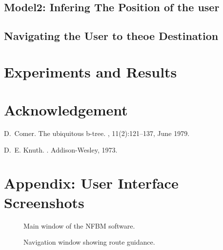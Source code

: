 \documentclass[a4paper]{article}
\begin{document}
\subsection{Model2: Infering The Position of the user}

\subsection{Navigating the User to theoe Destination}

\section{Experiments and Results}

\section{Acknowledgement}



%
%

\begin{thebibliography}{Com79}

D.~Comer.
\newblock The ubiquitous b-tree.
, 11(2):121--137, June 1979.

D.~E. Knuth.
.
\newblock Addison-Wesley, 1973.

\end{thebibliography}

\clearpage
\appendix
\section*{Appendix: User Interface Screenshots}

\begin{figure}[h!]
    \centering
    \caption{Main window of the NFBM software.}
\end{figure}

\begin{figure}[h!]
    \centering
    \caption{Navigation window showing route guidance.}
\end{figure}

\end{document}
